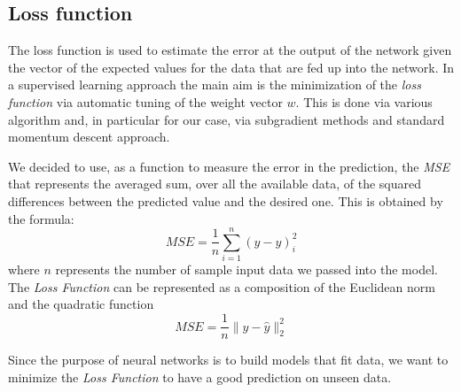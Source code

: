 \subsection{Loss function}
\label{Loss:Mse}
The loss function is used to estimate the error at the output of the network given the vector of the expected values for the data that are fed up into the network. In a supervised learning approach the main aim is the minimization of the \textit{loss function} via automatic tuning of the weight vector $w$. This is done via various algorithm and, in particular for our case, via subgradient methods and standard momentum descent approach.

We decided to use, as a function to measure the error in the prediction, the \textit{MSE} that represents the averaged sum, over all the available data, of the squared differences between the predicted value and the desired one.\newline
This is obtained by the formula: 	
\begin{equation}
MSE = \frac{1}{n} \sum_{i=1}^n (y - \widehat{y})_{i}^2
\end{equation}
where $n$ represents the number of sample input data we passed into the model. 
The \textit{Loss Function} can be represented as a composition of the Euclidean norm and the quadratic function
\begin{equation}
MSE = \frac{1}{n} \parallel y - \widehat{y} \parallel_{2}^2  
\end{equation}

Since the purpose of neural networks is to build models that fit data, we want to minimize the \textit{Loss Function} to have a good prediction on unseen data.\newline	
